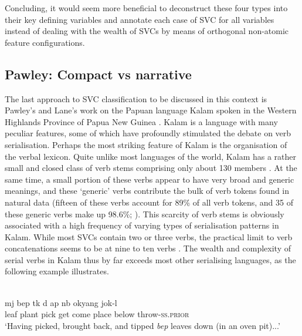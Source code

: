 Concluding, it would seem more beneficial to deconstruct these four types into their key defining variables and annotate each case of SVC for all variables instead of dealing with the wealth of SVCs by means of orthogonal non-atomic feature configurations. 

\subsection{Pawley: Compact vs narrative}

The last approach to SVC classification to be discussed in this context is Pawley's and Lane's work on the Papuan language Kalam spoken in the Western Highlands Province of Papua New Guinea \citep{Pawley1987, pawley1991saying, pawley2008serial, pawley2011event, lane2008kalam}. Kalam is a language with many peculiar features, some of which have profoundly stimulated the debate on verb serialisation. Perhaps the most striking feature of Kalam is the organisation of the verbal lexicon. Quite unlike most languages of the world, Kalam has a rather small and closed class of verb stems comprising only about 130 members \citep[7]{lane2008kalam}. At the same time, a small portion of these verbs appear to have very broad and generic meanings, and these `generic' verbs contribute the bulk of verb tokens found in natural data (fifteen of these verbs account for 89\% of all verb tokens, and 35 of these generic verbs make up 98.6\%; \citealt[7]{lane2008kalam}). This scarcity of verb stems is obviously associated with a high frequency of varying types of serialisation patterns in Kalam. While most SVCs contain two or three verbs, the practical limit to verb concatenations seems to be at nine to ten verbs \citep[172]{pawley2008serial}. The wealth and complexity of serial verbs in Kalam thus by far exceeds most other serialising languages, as the following example illustrates.

\ea \label{kalam1}
\\
\gll mj bep tk d ap nb okyang jok-l \\
leaf plant pick get come place below throw-\textsc{ss}.\textsc{prior} \\
\glft `Having picked, brought back, and tipped \textit{bep} leaves down (in an oven pit)...'\\ 
\z

